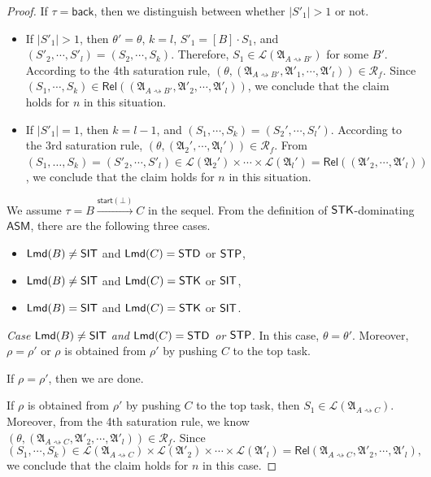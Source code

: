 \documentclass[preprint,12pt]{elsarticle}
\newcommand\lmd{{\sf Lmd}}
\newcommand\standard{{\sf STD}}
\newcommand\singletop{{\sf STP}}
\newcommand\singletask{{\sf STK}}
\newcommand\singleinstance{{\sf SIT}}
\newcommand{\AMASS}{\textsf{ASM}}
\newcommand\back{{\mathsf{back} }}
\newcommand\startactivity{{\mathsf{start} }}
\newcommand\AutReach{\mathscr{R}}
\newcommand\Rel{\mathsf{Rel}}
\newcommand\Aut{{\mathfrak{A} }}
\newcommand\Lang{{\mathscr{L} }}
\begin{document}
\begin{proof}
If $\tau = \back$, then we distinguish between whether $|S'_1| > 1$ or not. 
\begin{itemize}
\item If $|S'_1| > 1$, then $\theta' = \theta$, $k=l$, $S'_1 = [B] \cdot S_1$, and $(S'_2, \cdots, S'_l) = (S_2, \cdots, S_k)$. 
Therefore, $S_1 \in \Lang(\Aut_{A \rightsquigarrow B'})$ for some $B'$. According to the 4th saturation rule, $(\theta, (\Aut_{A \rightsquigarrow B'}, \Aut'_1, \cdots, \Aut'_l)) \in \AutReach_f$. Since $(S_1, \cdots, S_k) \in \Rel((\Aut_{A \rightsquigarrow B'}, \Aut'_2, \cdots, \Aut'_l))$, we conclude that the claim holds for $n$ in this situation. 
%
\item If $|S'_1| = 1$, then $k = l - 1$, and $(S_1,\cdots,S_k) = (S_2',\cdots,S_l')$. According to the 3rd saturation rule, $(\theta, (\Aut_2',\cdots,\Aut_l')) \in \AutReach_f$. From $(S_1,\dots,S_k) = (S'_2, \cdots, S'_l) \in \Lang(\Aut_2') \times \cdots \times \Lang(\Aut_l') = \Rel((\Aut'_2, \cdots, \Aut'_l))$, we conclude that the claim holds for $n$ in this situation. 
\end{itemize}


We assume $\tau = B \xrightarrow{\startactivity(\bot)} C$ in the sequel. From the definition of $\singletask$-dominating $\AMASS$, there are the following three cases. 
\begin{itemize}
\item $\lmd(B) \neq \singleinstance$ and $\lmd(C) = \standard$ or $\singletop$, 
%
\item $\lmd(B) \neq \singleinstance$ and $\lmd(C) = \singletask$ or $\singleinstance$, 
%
\item $\lmd(B) = \singleinstance$ and $\lmd(C) = \singletask$ or $\singleinstance$. 
\end{itemize}

\smallskip

\noindent \emph{Case $\lmd(B) \neq \singleinstance$ and $\lmd(C) = \standard$ or $\singletop$}. In this case, $\theta = \theta'$. Moreover, $\rho = \rho'$ or $\rho$ is obtained from $\rho'$ by pushing $C$ to the top task.

If $\rho = \rho'$, then we are done. 

If $\rho$ is obtained from $\rho'$ by pushing $C$ to the top task, then $S_1 \in \Lang(\Aut_{A \rightsquigarrow C})$. Moreover, from the 4th saturation rule, we know $(\theta, (\Aut_{A \rightsquigarrow C}, \Aut'_2, \cdots, \Aut'_l)) \in \AutReach_f$. 
Since 
$$(S_1, \cdots, S_k) \in \Lang(\Aut_{A \rightsquigarrow C}) \times \Lang(\Aut'_2) \times \cdots \times \Lang(\Aut'_l) = \Rel(\Aut_{A \rightsquigarrow C}, \Aut'_2, \cdots, \Aut'_l),$$ 
we conclude that the claim holds for $n$ in this case. 


\end{proof}
\end{document}

